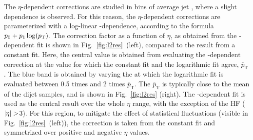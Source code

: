 \documentclass[11pt,twoside,a4paper,cmspaper,final,collab]{cms-tdr}
\begin{document}
The $\eta$-dependent corrections are studied in bins of average jet \pt, where a slight \pt dependence is observed. For this reason, the $\eta$-dependent corrections are parameterized with a log-linear \pt-dependence, according to the formula $p_0+p_1\log(p_{\mathrm{T}})$.
The correction factor as a function of $\eta$, as obtained from the \pt-dependent fit is shown in Fig.~\ref{fig:l2res}~(left), compared to the result from a constant fit. Here, the central value is obtained from evaluating the \pt-dependent correction at the \pt value for which the constant fit and the logarithmic fit agree, $\bar{p}_\mathrm{T}$. The blue band is obtained by varying the \pt at which the logarithmic fit is evaluated between 0.5 times and 2 times $\bar{p}_\mathrm{T}$.
The $\bar{p}_\mathrm{T}$ is typically close to the mean \pt of the dijet samples, and is shown in Fig.~\ref{fig:l2res} (right).
The \pt-dependent fit is used as the central result over the whole $\eta$ range, with the exception of the HF ($\lvert \eta \rvert>$3). For this region, to mitigate the effect of statistical fluctuations (visible \eg in Fig.~\ref{fig:l2res}~(left)), the correction is taken from the constant fit and symmetrized over positive and negative $\eta$ values.
\end{document}
